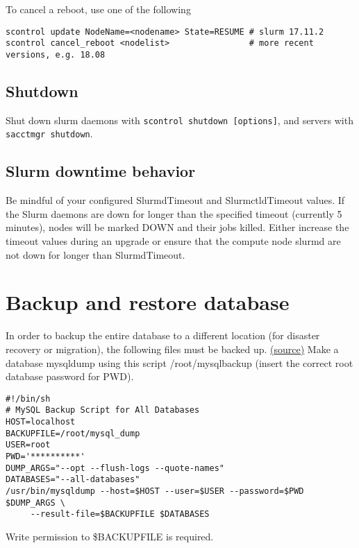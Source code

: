 To cancel a reboot, use one of the following

\begin{verbatim}
scontrol update NodeName=<nodename> State=RESUME # slurm 17.11.2
scontrol cancel_reboot <nodelist>                # more recent versions, e.g. 18.08
\end{verbatim}

\subsection{Shutdown} \label{subsec:slurmshutdown}

Shut down slurm daemons with \texttt{scontrol shutdown [options]}, and servers with \texttt{sacctmgr shutdown}.

\subsection{Slurm downtime behavior} \label{subsec:slurmdowntime}
Be mindful of your configured SlurmdTimeout and SlurmctldTimeout values. If the Slurm daemons are down for longer than the specified timeout (currently 5 minutes), nodes will be marked DOWN and their jobs killed. Either increase the timeout values during an upgrade or ensure that the compute node slurmd are not down for longer than SlurmdTimeout. 

\section{Backup and restore database} \label{sec:slurmDBbackup}

In order to backup the entire database to a different location (for disaster recovery or migration), the following files must be backed up. \href{https://wiki.fysik.dtu.dk/niflheim/Slurm_database#backup-and-restore-of-database}{(source)} Make a database mysqldump using this script /root/mysqlbackup (insert the correct root database password for PWD). 

\begin{verbatim}
#!/bin/sh
# MySQL Backup Script for All Databases
HOST=localhost
BACKUPFILE=/root/mysql_dump
USER=root
PWD='**********'
DUMP_ARGS="--opt --flush-logs --quote-names"
DATABASES="--all-databases"
/usr/bin/mysqldump --host=$HOST --user=$USER --password=$PWD $DUMP_ARGS \
     --result-file=$BACKUPFILE $DATABASES
\end{verbatim}

Write permission to \$BACKUPFILE is required.

